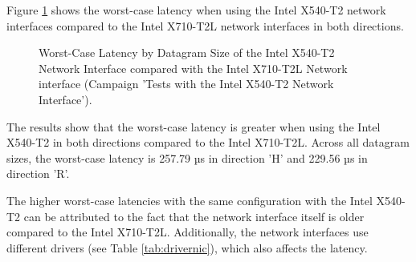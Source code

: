 Figure \ref{fig:540Wc} shows the worst-case latency when using the Intel X540-T2 network interfaces compared to the Intel X710-T2L network interfaces in both directions.

\begin{figure}[h!]
  \centering
  \vspace{10pt}
  \caption{Worst-Case Latency by Datagram Size of the Intel X540-T2 Network Interface compared with the Intel X710-T2L Network interface (Campaign 'Tests with the Intel X540-T2 Network Interface').}
  \label{fig:540Wc}
\end{figure}

The results show that the worst-case latency is greater when using the Intel X540-T2 in both directions compared to the Intel X710-T2L. Across all datagram sizes, the worst-case latency is 257.79 µs in direction 'H' and 229.56 µs in direction 'R'.

The higher worst-case latencies with the same configuration with the Intel X540-T2 can be attributed to the fact that the network interface itself is older compared to the Intel X710-T2L. Additionally, the network interfaces use different drivers (see Table \ref{tab:drivernic}), which also affects the latency.

